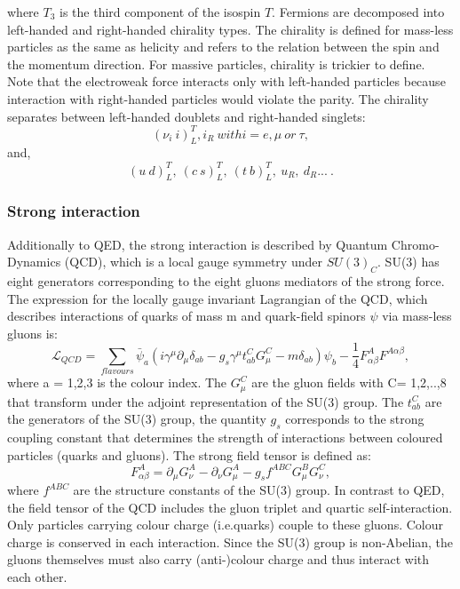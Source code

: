 where $T_3$ is the third component of the isospin $T$.
Fermions are decomposed into left-handed and right-handed chirality types. The chirality is defined for mass-less particles as the same as helicity and refers to the relation between the spin and the momentum direction. For massive particles, chirality is trickier to define. Note that the electroweak force interacts only with left-handed particles because interaction with right-handed particles would violate the parity. The chirality separates between left-handed doublets and right-handed singlets:
\begin{equation}
    (\nu_i \ i)^T_L, i_R \ with i = e, \mu \ or \ \tau,
\end{equation}
and, 
\begin{equation}
    (u \ d)^T_L, \ (c \ s)^T_L, \ (t \ b)^T_L, \ u_R, \ d_R ... \ . 
\end{equation}

\subsubsection{Strong interaction}
Additionally to QED, the strong interaction is described by Quantum Chromo-Dynamics (QCD), which is a local gauge symmetry under $SU(3)_C$. SU(3) has eight generators corresponding to the eight gluons mediators of the strong force. The expression for the locally gauge invariant Lagrangian of the QCD, which describes interactions of quarks of mass m and quark-field spinors $\psi$ via mass-less gluons is:
\begin{equation}
    \mathcal{L}_{QCD} = \sum_{flavours} \bar{\psi}_a(i\gamma^\mu\partial_\mu\delta_{ab}-g_{s}\gamma^\mu t^C_{ab}G^C_\mu - m\delta_{ab})\psi_b - \frac{1}{4}F^A_{\alpha\beta}F^{A\alpha\beta},
\end{equation}
where a = 1,2,3 is the colour index. The $G^{C}_\mu$ are the gluon fields with C= 1,2,..,8 that transform under the adjoint representation of the SU(3) group.  The $t^C_{ab}$ are the generators of the SU(3) group, the quantity $g_{s}$ corresponds to the strong coupling constant that determines the strength of interactions between coloured particles (quarks and gluons). The strong field tensor is defined as:
\begin{equation}
    F^A_{\alpha\beta} = \partial_\mu G^A_\nu - \partial_\nu G^A_\mu - g_sf^{ABC}G^B_\mu G^C_\nu,
\end{equation}
where $f^{ABC}$ are the structure constants of the SU(3) group. In contrast to QED, the field tensor of the QCD includes the gluon triplet and quartic self-interaction. Only particles carrying colour charge (i.e.quarks) couple to these gluons. Colour charge is conserved in each interaction. Since the SU(3) group is non-Abelian, the gluons themselves must also carry (anti-)colour charge and thus interact with each other. \\

